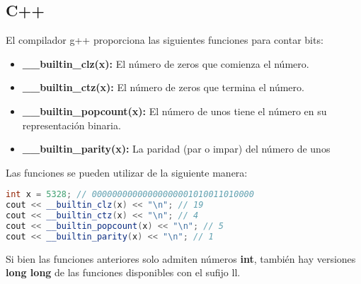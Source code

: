 \subsection{C++}

El compilador g++ proporciona las siguientes funciones para contar bits:

\begin{itemize}
	\item \textbf{\_\_builtin\_clz(x):} El número de zeros que comienza el número.
	\item \textbf{\_\_builtin\_ctz(x):} El número de zeros que termina el número.
	\item \textbf{\_\_builtin\_popcount(x):} El número de unos tiene el número en su representación binaria.
	\item \textbf{\_\_builtin\_parity(x):} La paridad (par o impar) del número de unos
\end{itemize}

Las funciones se pueden utilizar de la siguiente manera:

\begin{lstlisting}[language=C++]
int x = 5328; // 00000000000000000001010011010000
cout << __builtin_clz(x) << "\n"; // 19
cout << __builtin_ctz(x) << "\n"; // 4
cout << __builtin_popcount(x) << "\n"; // 5
cout << __builtin_parity(x) << "\n"; // 1
\end{lstlisting}

Si bien las funciones anteriores solo admiten números \textbf{int}, también hay versiones \textbf{long long} de las funciones disponibles con el sufijo ll.